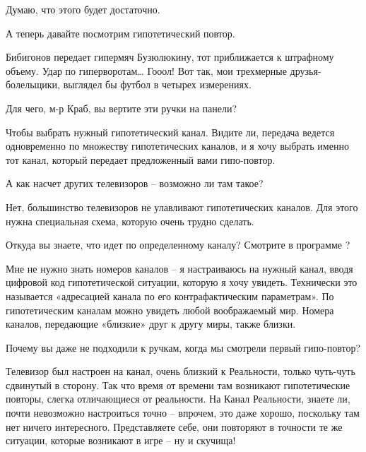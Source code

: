 \documentclass[../main.tex]{subfiles}
\begin{document}
\begin{dialogue}

Думаю, что этого будет достаточно.

 А теперь давайте посмотрим гипотетический повтор.


 Бибигонов передает гипермяч Бузюлюкину, тот приближается к штрафному объему. Удар по гиперворотам\ldots{} Гооол! Вот так, мои трехмерные друзья-болельщики, выглядел бы футбол в четырех измерениях.

 Для чего, м-р Краб, вы вертите эти ручки на панели?

 Чтобы выбрать нужный гипотетический канал. Видите ли, передача ведется одновременно по множеству гипотетических каналов, и я хочу выбрать именно тот канал, который передает предложенный вами гипо-повтор.

 А как насчет других телевизоров \--- возможно ли там такое?

 Нет, большинство телевизоров не улавливают гипотетических каналов. Для этого нужна специальная схема, которую очень трудно сделать.

 Откуда вы знаете, что идет по определенному каналу? Смотрите в программе ?

 Мне не нужно знать номеров каналов \--- я настраиваюсь на нужный канал, вводя цифровой код гипотетической ситуации, которую я хочу увидеть. Технически это называется «адресацией канала по его контрафактическим параметрам». По гипотетическим каналам можно увидеть любой воображаемый мир. Номера каналов, передающие «близкие» друг к другу миры, также близки.

 Почему вы даже не подходили к ручкам, когда мы смотрели первый гипо-повтор?

 Телевизор был настроен на канал, очень близкий к Реальности, только чуть-чуть сдвинутый в сторону. Так что время от времени там возникают гипотетические повторы, слегка отличающиеся от реальности. На Канал Реальности, знаете ли, почти невозможно настроиться точно \--- впрочем, это даже хорошо, поскольку там нет ничего интересного. Представляете себе, они повторяют в точности те же ситуации, которые возникают в игре \--- ну и скучища!


\end{dialogue}
\end{document}
